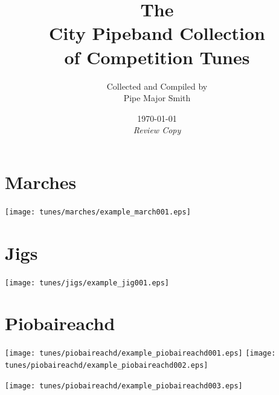 




\title{\textbf{\Huge{The\\ 
City Pipeband Collection }}\\
of Competition Tunes}

\author{Collected and Compiled by\\Pipe Major Smith}

\date{\today\\\textit{Review Copy}}

\maketitle

\tableofcontents
\cleardoublepage
{}


\chapter{Marches}
\vspace*{\fill}\newpage

    \texttt{[image: tunes/marches/example\_march001.eps]}


\cleardoublepage
\chapter{Jigs}
\vspace*{\fill}\newpage

    \texttt{[image: tunes/jigs/example\_jig001.eps]}




\cleardoublepage
\chapter{Piobaireachd}
\vspace*{\fill}\newpage


    \texttt{[image: tunes/piobaireachd/example\_piobaireachd001.eps]}
    \cleardoublepage
    \texttt{[image: tunes/piobaireachd/example\_piobaireachd002.eps]}
    \begin{center}
    \texttt{[image: tunes/piobaireachd/example\_piobaireachd003.eps]}
    \end{center}

